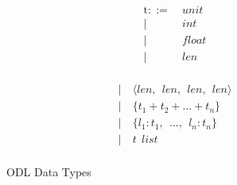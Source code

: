 \begin{figure}[th]
\begin{minipage}{0.4\columnwidth}
\begin{align*}
\text{t}::=~&unit\\
|~&int\\
|~&float\\
|~&len\\
\end{align*}
\end{minipage}
\begin{minipage}{0.4\columnwidth}
\begin{align*}
|~&\langle len, ~~ len, ~~ len, ~~ len\rangle\\
|~&\{t_1 + t_2 + ... + t_n\}\\
|~&\{l_1 : t_1, ~~ ..., ~~ l_n : t_n\}\\
|~&t ~~ list\\
\end{align*}
\end{minipage}
\caption{ODL Data Types}\label{fig:type}
\end{figure}

